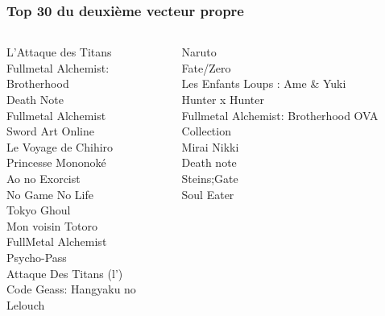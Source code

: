 \documentclass[handout]{beamer}
\begin{document}
\begin{frame}
    \frametitle{Top 30 du deuxième vecteur propre}
    \begin{columns}
    \begin{column}{0.5\textwidth}
                                L'Attaque des Titans\\
                    Fullmetal Alchemist: Brotherhood\\
                                          Death Note\\
                                 Fullmetal Alchemist\\
                                    Sword Art Online\\
                                Le Voyage de Chihiro\\
                                  Princesse Mononoké\\
                                      Ao no Exorcist\\
                                     No Game No Life\\
                                         Tokyo Ghoul\\
                                   Mon voisin Totoro\\
                                 FullMetal Alchemist\\
                                         Psycho-Pass\\
                             Attaque Des Titans (l')\\
                     Code Geass: Hangyaku no Lelouch\\
    \end{column}
    \begin{column}{0.5\textwidth}
                                              Naruto\\
                                           Fate/Zero\\
                      Les Enfants Loups : Ame \& Yuki\\
                                     Hunter x Hunter\\
     Fullmetal Alchemist: Brotherhood OVA Collection\\
                                         Mirai Nikki\\
                                          Death note\\
                                         Steins\string;Gate\\
                                          Soul Eater\\

\end{column}
\end{columns}
\end{frame}
\end{document}
